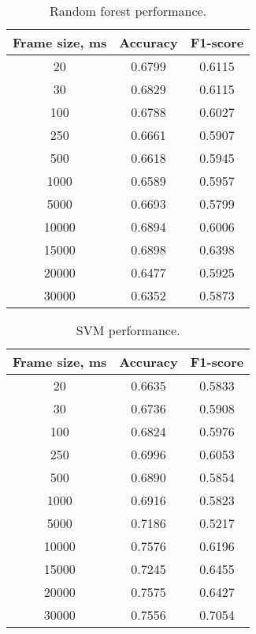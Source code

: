 \documentclass[conference]{IEEEtran}
\begin{document}

\begin{table}[h]
\centering
\caption{Random forest performance.}
\begin{tabular}{|c|c|c|}
\hline
\textbf{Frame size, ms} & \textbf{Accuracy} & \textbf{F1-score}\\
\hline
20 & 0.6799 & 0.6115 \\
\hline
30 & 0.6829 & 0.6115 \\
\hline
100 & 0.6788 & 0.6027 \\
\hline
250 & 0.6661 & 0.5907 \\
\hline
500 & 0.6618 & 0.5945 \\
\hline
1000 & 0.6589 & 0.5957 \\
\hline
5000 & 0.6693 & 0.5799 \\
\hline
10000 & 0.6894 & 0.6006 \\
\hline
15000 & 0.6898 & 0.6398 \\
\hline
20000 & 0.6477 & 0.5925 \\
\hline
30000 & 0.6352 & 0.5873 \\
\hline
\end{tabular}
\label{tab:random_forest_perf}
\end{table}


\begin{table}[h]
\centering
\caption{SVM performance.}
\begin{tabular}{|c|c|c|}
\hline
\textbf{Frame size, ms} & \textbf{Accuracy} & \textbf{F1-score}\\
\hline
20 & 0.6635 & 0.5833 \\
\hline
30 & 0.6736 & 0.5908 \\
\hline
100 & 0.6824 & 0.5976 \\
\hline
250 & 0.6996 & 0.6053 \\
\hline
500 & 0.6890 & 0.5854 \\
\hline
1000 & 0.6916 & 0.5823 \\
\hline
5000 & 0.7186 & 0.5217 \\
\hline
10000 & 0.7576 & 0.6196 \\
\hline
15000 & 0.7245 & 0.6455 \\
\hline
20000 & 0.7575 & 0.6427 \\
\hline
30000 & 0.7556 & 0.7054 \\
\hline
\end{tabular}
\label{tab:svm_perf}
\end{table}
\end{document}
